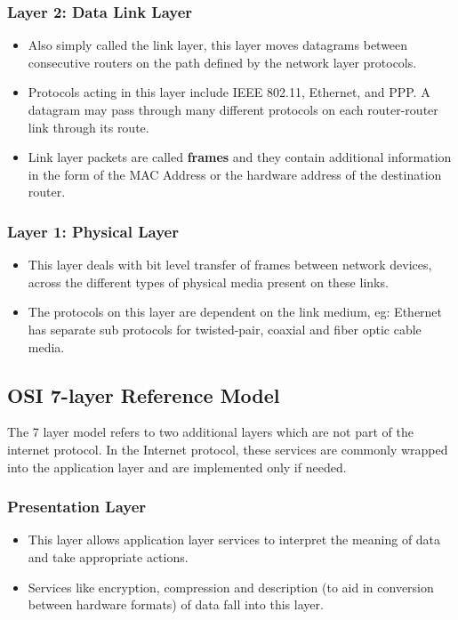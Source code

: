 \documentclass{article}
\theoremstyle{plain}
\theoremstyle{definition}
\begin{document}
\subsubsection{Layer 2: Data Link Layer}
\begin{itemize}
    \item Also simply called the link layer, this layer moves datagrams between consecutive routers on the path defined by the network layer protocols. 
    
    \item Protocols acting in this layer include IEEE 802.11, Ethernet, and PPP. A datagram may pass through many different protocols on each router-router link through its route. 
    
    \item Link layer packets are called \textbf{frames} and they contain additional information in the form of the MAC Address or the hardware address of the destination router. 
\end{itemize}

\subsubsection{Layer 1: Physical Layer}
\begin{itemize}
    \item This layer deals with bit level transfer of frames between network devices, across the different types of physical media present on these links.
    
    \item The protocols on this layer are dependent on the link medium, eg: Ethernet has separate sub protocols for twisted-pair, coaxial and fiber optic cable media. 
\end{itemize}

\subsection{OSI 7-layer Reference Model}
The 7 layer model refers to two additional layers which are not part of the internet protocol. In the Internet protocol, these services are commonly wrapped into the application layer and are implemented only if needed.
\subsubsection{Presentation Layer}
\begin{itemize}
    \item This layer allows application layer services to interpret the meaning of data and take appropriate actions.
    
    \item Services like encryption, compression and description (to aid in conversion between hardware formats) of data fall into this layer. 
\end{itemize}
\end{document}
